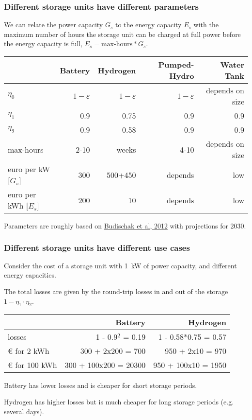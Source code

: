\documentclass[10pt,dvipsnames]{beamer}
\newcommand{\ra}[1]{\renewcommand{\arraystretch}{#1}}
\begin{document}
\begin{frame}
  \frametitle{Different storage units have different parameters}

  We can relate the power capacity $G_s$ to the energy capacity $E_s$
  with the maximum number of hours the storage unit can be charged at full
power before the energy capacity is full, $E_s =
  \textrm{max-hours}*G_s$.

  \ra{1.05}
  \begin{table}[!t]
    \begin{tabular}{lrrrr}
      \toprule
      & Battery & Hydrogen & Pumped-Hydro & Water Tank\\
      \midrule
      $\eta_0$ & $1-\varepsilon$ & $1-\varepsilon$ & $1-\varepsilon$ & depends on size  \\
      $\eta_1$ & 0.9 & 0.75 & 0.9 & 0.9 \\
      $\eta_2$ & 0.9 & 0.58 & 0.9 & 0.9 \\
      max-hours & 2-10 & weeks & 4-10 & depends on size \\
      euro per kW [$G_s$] &300 &500+450 & depends& low \\
      euro per kWh [$E_s$] &200 & 10 &depends&low \\
      \bottomrule
    \end{tabular}
  \end{table}
Parameters are roughly based on
\href{http://www.sciencedirect.com/science/article/pii/S0378775312014759}{Budischak
  et al, 2012} with projections for 2030.


\end{frame}

\begin{frame}
  \frametitle{Different storage units have different use cases}

  Consider the cost of a storage unit with 1~kW of power capacity, and different energy capacities.

  The total losses are given by the \alert{round-trip losses} in and
  out of the storage $1- \eta_1\cdot \eta_2$.

  \ra{1.05}
  \begin{table}[!t]
    \begin{tabular}{lrr}
      \toprule
      & Battery & Hydrogen \\
      \midrule
      losses & 1 - 0.9$^2$ = 0.19 & 1 - 0.58*0.75 = 0.57 \\
      \euro{} for 2 kWh & 300 + 2x200 = 700 & 950 + 2x10 = 970 \\
      \euro{} for 100 kWh & 300 + 100x200 = 20300 & 950 + 100x10 = 1950 \\
      \bottomrule
    \end{tabular}
  \end{table}

  Battery has lower losses and is cheaper for short storage periods.

  Hydrogen has higher losses but is much cheaper for long storage periods (e.g. several days).
\end{frame}
\end{document}
